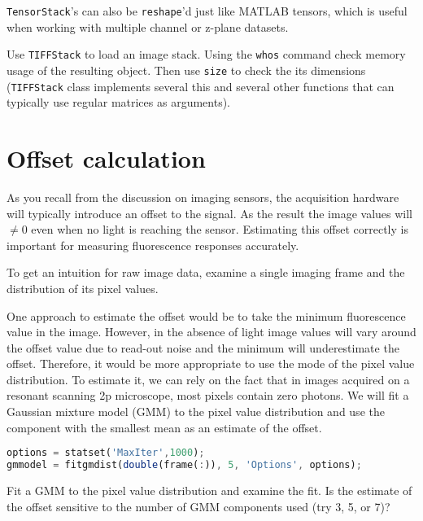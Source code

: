 \documentclass[a4paper]{report}
\newcommand{\nexercise}[0]{\arabic{exercises}\addtocounter{exercises}{1}}
\begin{document}
\texttt{TensorStack}'s can also be \texttt{reshape}'d just like MATLAB tensors, which is useful when working with multiple channel or z-plane datasets.

\begin{exercisebox}[frametitle={Exercise \nexercise: Using \texttt{TIFFStack} to memory map image data}]
Use \texttt{TIFFStack} to load an image stack. Using the \texttt{whos} command check memory usage of the resulting object. 
Then use \texttt{size} to check the its dimensions (\texttt{TIFFStack} class implements several this and several other functions that can typically use regular matrices as arguments). 
\end{exercisebox}

\section{Offset calculation}
As you recall from the discussion on imaging sensors, the acquisition hardware will typically introduce an offset to the signal. 
As the result the image values will $\neq 0$ even when no light is reaching the sensor. 
Estimating this offset correctly is important for measuring fluorescence responses accurately. 

\begin{exercisebox}[frametitle={Exercise \nexercise: Pixel value distribution}]
To get an intuition for raw image data, examine a single imaging frame and the distribution of its pixel values.
\end{exercisebox}

One approach to estimate the offset would be to take the minimum fluorescence value in the image. 
However, in the absence of light image values will vary around the offset value due to read-out noise and the minimum will underestimate the offset. 
Therefore, it would be more appropriate to use the mode of the pixel value distribution. 
To estimate it, we can rely on the fact that in images acquired on a resonant scanning 2p microscope, most pixels contain zero photons. 
We will fit a Gaussian mixture model (GMM) to the pixel value distribution and use the component with the smallest mean as an estimate of the offset.
\begin{lstlisting}[language=Octave]
% fit GMM with 5 Gaussians
options = statset('MaxIter',1000);
gmmodel = fitgmdist(double(frame(:)), 5, 'Options', options);
\end{lstlisting}

\begin{exercisebox}[frametitle={Exercise \nexercise: GMM for offset estimation}]
Fit a GMM to the pixel value distribution and examine the fit. Is the estimate of the offset sensitive to the number of GMM components used (try 3, 5, or 7)?
\end{exercisebox}
\end{document}
